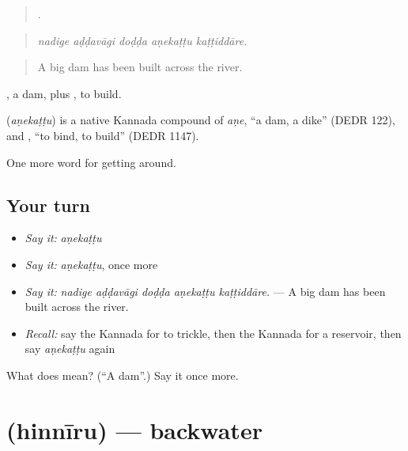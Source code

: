 \begin{quote}
    .
\end{quote}

\begin{quote}
\emph{nadige aḍḍavāgi doḍḍa aṇekaṭṭu kaṭṭiddāre.}
\end{quote}

\begin{quote}
A big dam has been built across the river.
\end{quote}

, a dam, plus , to build.

\begin{cousinweb}
\textbf{} (\emph{aṇekaṭṭu}) is a native Kannada compound of \emph{aṇe}, \textquotedblleft{}a dam, a dike\textquotedblright{} (DEDR 122), and , \textquotedblleft{}to bind, to build\textquotedblright{} (DEDR 1147).
\end{cousinweb}

\begin{grammarlens}[title={What you've built}]
One more word for getting around.
\end{grammarlens}

\subsection*{Your turn}
\begin{itemize}
\raggedright
  \item \emph{Say it:} \emph{aṇekaṭṭu}
  \item \emph{Say it:} \emph{aṇekaṭṭu}, once more
  \item \emph{Say it:} \emph{nadige aḍḍavāgi doḍḍa aṇekaṭṭu kaṭṭiddāre.} — A big dam has been built across the river.
  \item \emph{Recall:} say the Kannada for to trickle, then the Kannada for a reservoir, then say \emph{aṇekaṭṭu} again
\end{itemize}

\begin{tcolorbox}[breakable,colback=teal!4,colframe=teal!35!black,title={Before you move on}]
What does  mean? (\textquotedblleft{}A dam\textquotedblright{}.) Say it once more.
\end{tcolorbox}
\section[\texorpdfstring{\kn{ಹಿನ್ನೀರು} (hinnīru)}{ಹಿನ್ನೀರು (hinnīru)}]{ (hinnīru) — backwater}


